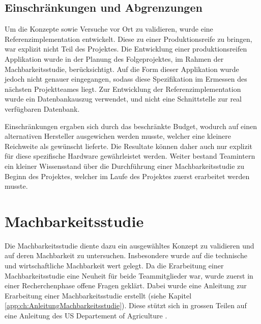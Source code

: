 \subsection{Einschränkungen und Abgrenzungen}
Um die Konzepte sowie Versuche vor Ort zu validieren, wurde eine Referenzimplementation entwickelt. Diese zu einer Produktionsreife zu bringen, war explizit nicht Teil des Projektes. Die Entwicklung einer produktionsreifen Applikation wurde in der Planung des Folgeprojektes, im Rahmen der Machbarkeitsstudie, berücksichtigt. Auf die Form dieser Applikation wurde jedoch nicht genauer eingegangen, sodass diese Spezifikation im Ermessen des nächsten Projektteames liegt. Zur Entwicklung der Referenzimplementation wurde ein Datenbankauszug verwendet, und nicht eine Schnittstelle zur real verfügbaren Datenbank.

Einschränkungen ergaben sich durch das beschränkte Budget, wodurch auf einen alternativen Hersteller ausgewichen werden musste, welcher eine kleinere Reichweite als gewünscht lieferte. Die Resultate können daher auch nur explizit für diese spezifische Hardware gewährleistet werden.
Weiter bestand Teamintern ein kleiner Wissensstand über die Durchführung einer Machbarkeitsstudie zu Beginn des Projektes, welcher im Laufe des Projektes zuerst erarbeitet werden musste.

\section{Machbarkeitsstudie}
Die Machbarkeitsstudie diente dazu ein ausgewähltes Konzept zu validieren und auf deren Machbarkeit zu untersuchen. Insbesondere wurde auf die technische und wirtschaftliche Machbarkeit wert gelegt. Da die Erarbeitung einer Machbarkeitsstudie eine Neuheit für beide Teammitglieder war, wurde zuerst in einer Recherchenphase offene Fragen geklärt. Dabei wurde eine Anleitung zur Erarbeitung einer Machbarkeitsstudie erstellt (siehe Kapitel \ref{app:ch:AnleitungMachbarkeitsstudie}). Diese stützt sich in grossen Teilen auf eine Anleitung des US Departement of Agriculture \parencite{Matson2000}.
